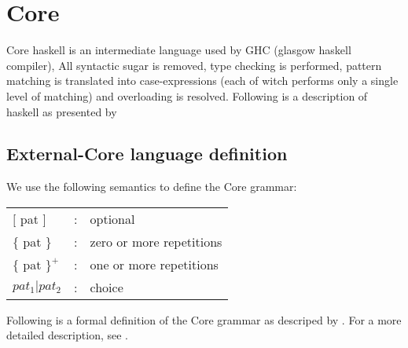 
\section{Core}

Core haskell is an intermediate language used by GHC (glasgow haskell compiler),
All syntactic sugar is removed, type checking is performed, pattern matching is
translated into case-expressions (each of witch performs only a single level of
matching) and overloading is resolved.\cite{jones1992implementing} Following
is a description of haskell as presented by \cite{tolmach2010ghc}

\subsection{External-Core language definition}

We use the following semantics to define the Core grammar:

\begin{longtable}{ l c l }

$[$ pat $]$		& :	& optional			\\
$\{$ pat $\}$		& :	& zero or more repetitions	\\
$\{$ pat $\}^{+}$	& :	& one or more repetitions	\\
$pat_{1}|pat_{2}$	& :	& choice			\\

\end{longtable}

Following is a formal definition of the Core grammar as descriped by \cite{jones1992implementing}.
For a more detailed description, see \cite{jones1992implementing}.

